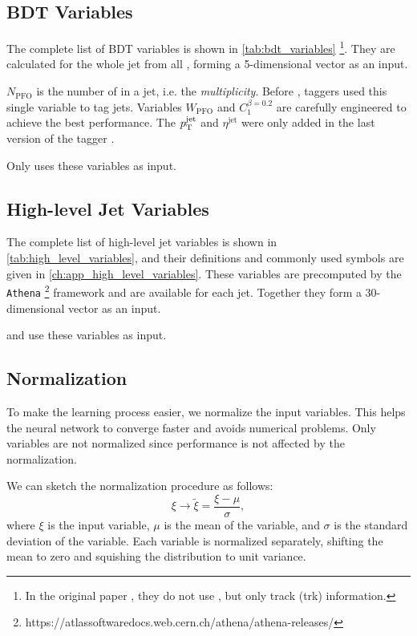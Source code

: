 \subsection{BDT Variables}
\label{sec:bdt_variables}

The complete list of BDT variables is shown in \cref{tab:bdt_variables} \cite{bdt_tag} \footnote{In the original paper \cite{bdt_tag}, they do not use \PFOs, but only track (trk) information.}.
They are calculated for the whole jet from all \PFOs, forming a 5-dimensional vector as an input.

$N_\mathrm{PFO}$ is the number of \PFOs in a jet, i.e. the \emph{multiplicity}.
Before \bdt, taggers used this single variable to tag jets. 
Variables $W_\mathrm{PFO}$ and $C_1^{\beta = 0.2}$ are carefully engineered to achieve the best performance.
The $p_\text{T}^{\text{jet}}$ and $\eta^\mathrm{jet}$ were only added in the last version of the tagger \cite{bdt_tag}.

Only \bdt uses these variables as input.

\subsection{High-level Jet Variables}
\label{sec:high_level_variables}

The complete list of high-level jet variables is shown in \cref{tab:high_level_variables}, and their definitions and commonly used symbols are given in \cref{ch:app_high_level_variables}.
These variables are precomputed by the \texttt{Athena} \footnote{https://atlassoftwaredocs.web.cern.ch/athena/athena-releases/} framework and are available for each jet.
Together they form a 30-dimensional vector as an input.

\fc and \highway use these variables as input.

\subsection{Normalization}
\label{sec:input_normalization}
To make the learning process easier, we normalize the input variables.
This helps the neural network to converge faster and avoids numerical problems.
Only \bdt variables are not normalized since \bdt performance is not affected by the normalization.

We can sketch the normalization procedure as follows:
\begin{equation}
    \xi \rightarrow \tilde{\xi} = \frac{\xi - \mu}{\sigma},
\end{equation}
where $\xi$ is the input variable, $\mu$ is the mean of the variable, and $\sigma$ is the standard deviation of the variable.
Each variable is normalized separately, shifting the mean to zero and squishing the distribution to unit variance.

